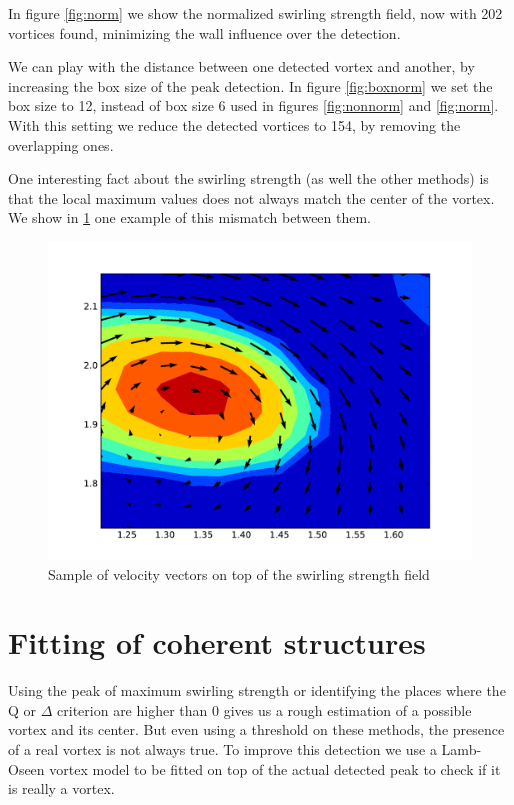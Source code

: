\documentclass[12pt, a4paper, openany]{memoir}
\begin{document}
In figure \ref{fig:norm} we show the normalized swirling strength field, now with 202 vortices found, minimizing the wall influence over the detection.

We can play with the distance between one detected vortex and another, by increasing the box size of the peak detection. In figure \ref{fig:boxnorm} we set the box size to 12, instead of box size 6 used in figures \ref{fig:nonnorm} and \ref{fig:norm}. With this setting we reduce the detected vortices to 154, by removing the overlapping ones.

One interesting fact about the swirling strength (as well the other methods) is that the local maximum values does not always match the center of the vortex. We show in \ref{fig:quiverDNS1} one example of this mismatch between them.

\begin{figure}[h]
	\centering
	\includegraphics[scale=0.6]{figure/dns_quiver1.pdf}
	\caption{Sample of velocity vectors on top of the swirling strength field}
	\label{fig:quiverDNS1}
\end{figure} 

\section{Fitting of coherent structures}

Using the peak of maximum swirling strength or identifying the places where the Q or $\Delta$ criterion are higher than 0 gives us a rough estimation of a possible vortex and its center. But even using a threshold on these methods, the presence of a real vortex is not always true. To improve this detection we use a Lamb-Oseen vortex model to be fitted on top of the actual detected peak to check if it is really a vortex. 
\end{document}
